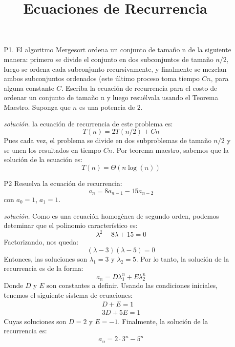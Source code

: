 \documentclass[dcc]{fcfmcourse}
\title{Ecuaciones de Recurrencia}
\begin{document}
\maketitle

\vspace{-1ex}

\begin{itemize}
\item[P1.] El algoritmo Mergesort ordena un conjunto de tamaño n de la siguiente manera: primero se divide el conjunto en dos subconjuntos de tamaño $n/2$, luego se ordena cada subconjunto recursivamente, y finalmente se mezclan ambos subconjuntos ordenados (este último proceso toma tiempo $Cn$, para alguna constante $C$. Escriba la ecuación de recurrencia para el costo de ordenar un conjunto de tamaño n y luego resuélvala usando el Teorema Maestro. Suponga que $n$ es una potencia de $2$.

\item[\textit{solución}.] la ecuación de recurrencia de este problema es:
\begin{equation}
T(n) = 2T(n/2) + Cn
\end{equation}
Pues cada vez, el problema se divide en dos subproblemas de tamaño $n/2$ y se unen los resultados en tiempo $Cn$.
Por teorema maestro, sabemos que la solución de la ecuación es:
\begin{equation}
T(n) = \Theta(n\log(n))
\end{equation}

\item[P2] Resuelva la ecuación de recurrencia:
\begin{equation}
a_n = 8a_{n −1} − 15a_{n −2}
\end{equation}
con $a_0 = 1$, $a_1 = 1$.

\item[\textit{solución}.] Como es una ecuación homogénea de segundo orden, podemos deteminar que el polinomio característico es:
\begin{equation}
\lambda^2 - 8\lambda + 15 = 0
\end{equation}
Factorizando, nos queda:
\begin{equation}
(\lambda - 3)(\lambda - 5) = 0
\end{equation}
Entonces, las soluciones son $\lambda_1 = 3$ y $\lambda_2 = 5$. Por lo tanto, la solución de la recurrencia es de la forma:
\begin{equation}
a_n = D\lambda_1^n + E\lambda_2^n
\end{equation}
Donde $D$ y $E$ son constantes a definir. Usando las condiciones iniciales, tenemos el siguiente sistema de ecuaciones:
\begin{align*}
D + E = 1\\
3D + 5E = 1
\end{align*}
Cuyas soluciones son $D = 2$ y $E = -1$. Finalmente, la solución de la recurrencia es:
\begin{equation}
a_n = 2\cdot 3^n - 5^n
\end{equation}



\end{itemize}
\end{document}
